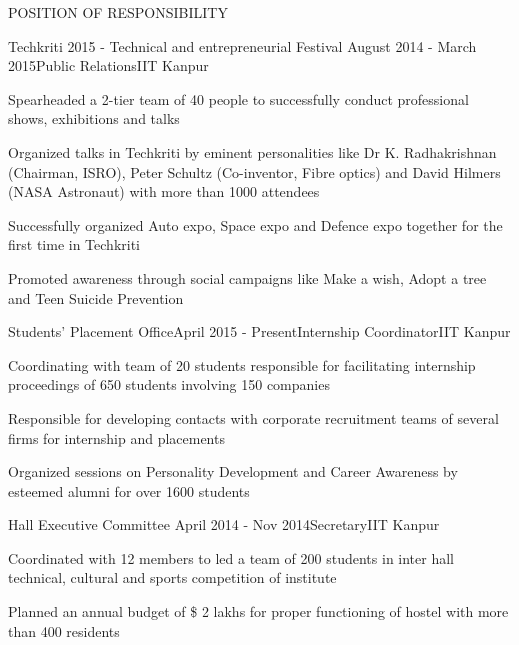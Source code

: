 \documentclass{resume} %
\begin{document}
\begin{rSection}{POSITION OF RESPONSIBILITY}

\begin{rSubsection}{Techkriti 2015 - Technical and entrepreneurial Festival }{August 2014 - March 2015}{Public Relations}{IIT Kanpur}
\item Spearheaded a 2-tier team of 40 people to successfully conduct professional shows, exhibitions and talks
\item Organized talks in Techkriti by eminent personalities like Dr K. Radhakrishnan (Chairman, ISRO), Peter Schultz (Co-inventor, Fibre optics) and David Hilmers (NASA Astronaut) with more than 1000 attendees
\item Successfully organized Auto expo, Space expo and Defence expo together for the first time in Techkriti
\item Promoted awareness through social campaigns like Make a wish, Adopt a tree and Teen Suicide Prevention
\end{rSubsection}


\begin{rSubsection}{Students' Placement Office}{April 2015 - Present}{Internship Coordinator}{IIT Kanpur}
\item Coordinating with team of 20 students responsible for facilitating internship proceedings of 650 students involving 150 companies
 \item Responsible for developing contacts with corporate recruitment teams of several firms for internship and placements 
 \item Organized sessions on Personality Development and Career Awareness by esteemed alumni for over 1600 students
\end{rSubsection}


\begin{rSubsection}{Hall Executive Committee }{April 2014 - Nov 2014}{Secretary}{IIT Kanpur}
\item Coordinated with 12 members to led a team of 200 students in inter hall technical, cultural and sports competition of institute 
\item Planned an annual budget of \$ 2 lakhs for proper functioning of hostel with more than 400 residents
\end{rSubsection}

\end{rSection}
\end{document}

